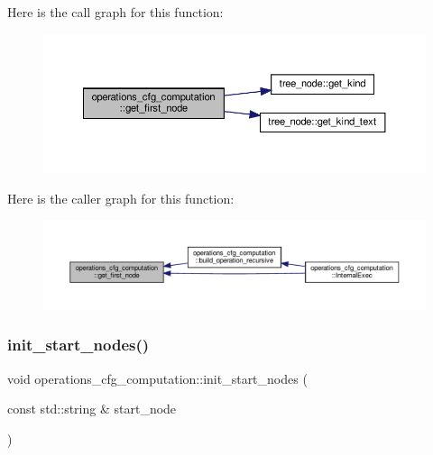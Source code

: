 Here is the call graph for this function\+:
\nopagebreak
\begin{figure}[H]
\begin{center}
\leavevmode
\includegraphics[width=350pt]{d0/d11/classoperations__cfg__computation_a552a18ba450de75c9651cc9eda82f3ac_cgraph}
\end{center}
\end{figure}
Here is the caller graph for this function\+:
\nopagebreak
\begin{figure}[H]
\begin{center}
\leavevmode
\includegraphics[width=350pt]{d0/d11/classoperations__cfg__computation_a552a18ba450de75c9651cc9eda82f3ac_icgraph}
\end{center}
\end{figure}
\mbox{\label{classoperations__cfg__computation_ae1d29037a601f373f5d8db0faed1ffbf}} 
\subsubsection{\texorpdfstring{init\+\_\+start\+\_\+nodes()}{init\_start\_nodes()}}
{\footnotesize\ttfamily void operations\+\_\+cfg\+\_\+computation\+::init\+\_\+start\+\_\+nodes (\begin{DoxyParamCaption}\item[{const std\+::string \&}]{start\+\_\+node }\end{DoxyParamCaption})\hspace{0.3cm}{\ttfamily [private]}}



